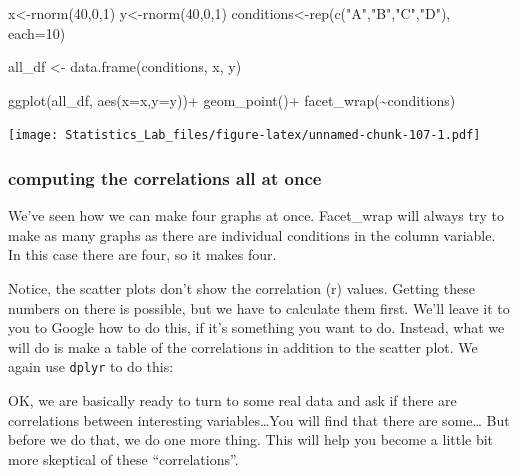 \documentclass[
]{book}
\newenvironment{Shaded}{\begin{snugshade}}{\end{snugshade}}
\newcommand{\AttributeTok}[1]{\textcolor[rgb]{0.77,0.63,0.00}{#1}}
\newcommand{\DecValTok}[1]{\textcolor[rgb]{0.00,0.00,0.81}{#1}}
\newcommand{\FunctionTok}[1]{\textcolor[rgb]{0.00,0.00,0.00}{#1}}
\newcommand{\NormalTok}[1]{#1}
\newcommand{\OtherTok}[1]{\textcolor[rgb]{0.56,0.35,0.01}{#1}}
\newcommand{\SpecialCharTok}[1]{\textcolor[rgb]{0.00,0.00,0.00}{#1}}
\newcommand{\StringTok}[1]{\textcolor[rgb]{0.31,0.60,0.02}{#1}}
\begin{document}
\begin{Shaded}
\begin{Highlighting}[]
\NormalTok{x}\OtherTok{\textless{}{-}}\FunctionTok{rnorm}\NormalTok{(}\DecValTok{40}\NormalTok{,}\DecValTok{0}\NormalTok{,}\DecValTok{1}\NormalTok{)}
\NormalTok{y}\OtherTok{\textless{}{-}}\FunctionTok{rnorm}\NormalTok{(}\DecValTok{40}\NormalTok{,}\DecValTok{0}\NormalTok{,}\DecValTok{1}\NormalTok{)}
\NormalTok{conditions}\OtherTok{\textless{}{-}}\FunctionTok{rep}\NormalTok{(}\FunctionTok{c}\NormalTok{(}\StringTok{"A"}\NormalTok{,}\StringTok{"B"}\NormalTok{,}\StringTok{"C"}\NormalTok{,}\StringTok{"D"}\NormalTok{), }\AttributeTok{each=}\DecValTok{10}\NormalTok{)}

\NormalTok{all\_df }\OtherTok{\textless{}{-}} \FunctionTok{data.frame}\NormalTok{(conditions, x, y)}

\FunctionTok{ggplot}\NormalTok{(all\_df, }\FunctionTok{aes}\NormalTok{(}\AttributeTok{x=}\NormalTok{x,}\AttributeTok{y=}\NormalTok{y))}\SpecialCharTok{+}
  \FunctionTok{geom\_point}\NormalTok{()}\SpecialCharTok{+}
  \FunctionTok{facet\_wrap}\NormalTok{(}\SpecialCharTok{\textasciitilde{}}\NormalTok{conditions)}
\end{Highlighting}
\end{Shaded}

\texttt{[image: Statistics\_Lab\_files/figure-latex/unnamed-chunk-107-1.pdf]}

\hypertarget{computing-the-correlations-all-at-once}{%
\subsubsection{computing the correlations all at once}\label{computing-the-correlations-all-at-once}}

We've seen how we can make four graphs at once. Facet\_wrap will always try to make as many graphs as there are individual conditions in the column variable. In this case there are four, so it makes four.

Notice, the scatter plots don't show the correlation (r) values. Getting these numbers on there is possible, but we have to calculate them first. We'll leave it to you to Google how to do this, if it's something you want to do. Instead, what we will do is make a table of the correlations in addition to the scatter plot. We again use \texttt{dplyr} to do this:

OK, we are basically ready to turn to some real data and ask if there are correlations between interesting variables\ldots You will find that there are some\ldots{} But before we do that, we do one more thing. This will help you become a little bit more skeptical of these ``correlations''.
\end{document}
